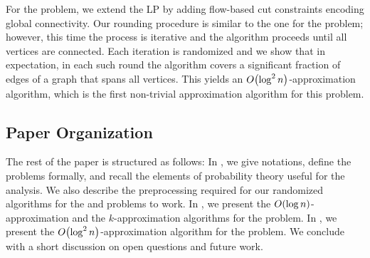 For the \connectivity problem, we extend the LP by adding flow-based cut constraints encoding global connectivity. Our rounding procedure is similar to the one for the \coverage problem; however, this time the process is iterative and the algorithm proceeds until all vertices are connected. Each iteration is randomized and we show that in expectation, in each such round the algorithm covers a significant fraction of edges of a graph that spans all vertices. This yields an $O\mathopen{}\left( \log^2 n \right)$-approximation algorithm, which is the first non-trivial approximation algorithm for this problem.

\subsection{Paper Organization}

The rest of the paper is structured as follows:
In , we give notations, define the problems formally, and recall the elements of probability theory useful for the analysis. We also describe the preprocessing required for our randomized algorithms for the \coverage and \connectivity problems to work.
In , we present the $O\mathopen{}\left( \log n \right)$-approximation and the $k$-approximation algorithms for the \coverage problem.
In , we present the $O\mathopen{}\left( \log^2 n \right)$-approximation algorithm for the \connectivity problem.
We conclude with a short discussion on open questions and future work.